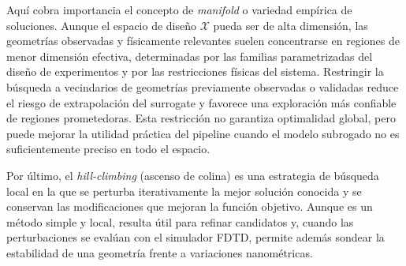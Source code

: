 Aquí cobra importancia el concepto de \textit{manifold} o variedad empírica de soluciones. Aunque el espacio de diseño $\mathcal{X}$ pueda ser de alta dimensión, las geometrías observadas y físicamente relevantes suelen concentrarse en regiones de menor dimensión efectiva, determinadas por las familias parametrizadas del diseño de experimentos y por las restricciones físicas del sistema. Restringir la búsqueda a vecindarios de geometrías previamente observadas o validadas reduce el riesgo de extrapolación del surrogate y favorece una exploración más confiable de regiones prometedoras. Esta restricción no garantiza optimalidad global, pero puede mejorar la utilidad práctica del pipeline cuando el modelo subrogado no es suficientemente preciso en todo el espacio.

Por último, el \textit{hill-climbing} (ascenso de colina) es una estrategia de búsqueda local en la que se perturba iterativamente la mejor solución conocida y se conservan las modificaciones que mejoran la función objetivo. Aunque es un método simple y local, resulta útil para refinar candidatos y, cuando las perturbaciones se evalúan con el simulador FDTD, permite además sondear la estabilidad de una geometría frente a variaciones nanométricas.
